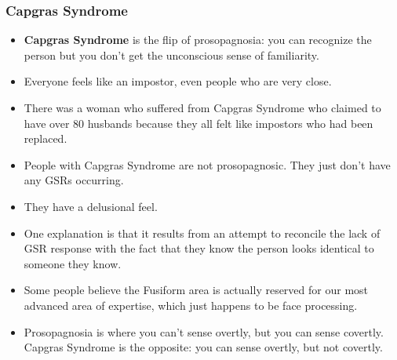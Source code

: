 \documentclass[]{article}
\begin{document}
			\subsubsection{Capgras Syndrome}
				\begin{itemize}
					\item \textbf{Capgras Syndrome} is the flip of prosopagnosia: you can recognize the person but you don't get the unconscious sense of familiarity.
					\item Everyone feels like an impostor, even people who are very close.
					\item There was a woman who suffered from Capgras Syndrome who claimed to have over 80 husbands because they all felt like impostors who had been replaced.
					\item People with Capgras Syndrome are not prosopagnosic. They just don't have any GSRs occurring.
					\item They have a delusional feel.
					\item One explanation is that it results from an attempt to reconcile the lack of GSR response with the fact that they know the person looks identical to someone they know.
					\item Some people believe the Fusiform area is actually reserved for our most advanced area of expertise, which just happens to be face processing.
					\item Prosopagnosia is where you can't sense overtly, but you can sense covertly. Capgras Syndrome is the opposite: you can sense overtly, but not covertly.
				\end{itemize}
\end{document}
